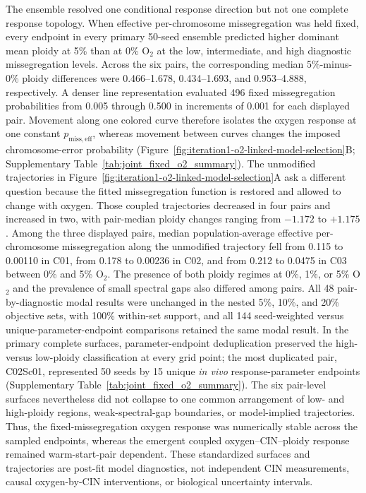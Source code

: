 \documentclass[11pt]{article}
\begin{document}
The ensemble resolved one conditional response direction but not one complete response topology. When effective per-chromosome missegregation was held fixed, every endpoint in every primary 50-seed ensemble predicted higher dominant mean ploidy at 5\% than at 0\% O$_2$ at the low, intermediate, and high diagnostic missegregation levels. Across the six pairs, the corresponding median 5\%-minus-0\% ploidy differences were 0.466--1.678, 0.434--1.693, and 0.953--4.888, respectively. A denser line representation evaluated 496 fixed missegregation probabilities from 0.005 through 0.500 in increments of 0.001 for each displayed pair. Movement along one colored curve therefore isolates the oxygen response at one constant \(p_{\mathrm{miss,eff}}\), whereas movement between curves changes the imposed chromosome-error probability (Figure~\ref{fig:iteration1-o2-linked-model-selection}B; Supplementary Table~\ref{tab:joint_fixed_o2_summary}). The unmodified trajectories in Figure~\ref{fig:iteration1-o2-linked-model-selection}A ask a different question because the fitted missegregation function is restored and allowed to change with oxygen. Those coupled trajectories decreased in four pairs and increased in two, with pair-median ploidy changes ranging from $-1.172$ to $+1.175$. Among the three displayed pairs, median population-average effective per-chromosome missegregation along the unmodified trajectory fell from 0.115 to 0.00110 in C01, from 0.178 to 0.00236 in C02, and from 0.212 to 0.0475 in C03 between 0\% and 5\% O$_2$. The presence of both ploidy regimes at 0\%, 1\%, or 5\% O$_2$ and the prevalence of small spectral gaps also differed among pairs. All 48 pair-by-diagnostic modal results were unchanged in the nested 5\%, 10\%, and 20\% objective sets, with 100\% within-set support, and all 144 seed-weighted versus unique-parameter-endpoint comparisons retained the same modal result. In the primary complete surfaces, parameter-endpoint deduplication preserved the high- versus low-ploidy classification at every grid point; the most duplicated pair, C02Sc01, represented 50 seeds by 15 unique \textit{in vivo} response-parameter endpoints (Supplementary Table~\ref{tab:joint_fixed_o2_summary}). The six pair-level surfaces nevertheless did not collapse to one common arrangement of low- and high-ploidy regions, weak-spectral-gap boundaries, or model-implied trajectories. Thus, the fixed-missegregation oxygen response was numerically stable across the sampled endpoints, whereas the emergent coupled oxygen--CIN--ploidy response remained warm-start-pair dependent. These standardized surfaces and trajectories are post-fit model diagnostics, not independent CIN measurements, causal oxygen-by-CIN interventions, or biological uncertainty intervals.
\end{document}
